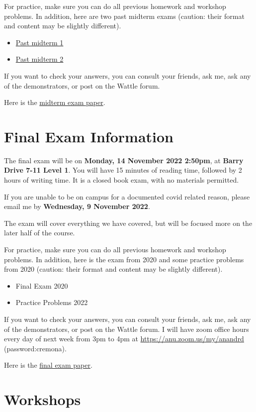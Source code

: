 \documentclass[11pt]{article}
\begin{document}
For practice, make sure you can do all previous homework and workshop problems.
In addition, here are two past midterm exams (caution: their format and content may be slightly different).

\begin{itemize}
\item \href{midterm-1-practice.pdf}{Past midterm 1}
\item \href{midterm-1-practice2.pdf}{Past midterm 2}
\end{itemize}

If you want to check your answers, you can consult your friends, ask me, ask any of the demonstrators, or post on the Wattle forum.

Here is the \href{midterm-msi.pdf}{midterm exam paper}.

\section{Final Exam Information}
\label{sec:orgc2e0692}
The final exam will be on \textbf{Monday, 14 November 2022 2:50pm}, at \textbf{Barry Drive 7-11 Level 1}.
You will have 15 minutes of reading time, followed by 2 hours of writing time.
It is a closed book exam, with no materials permitted.

If you are unable to be on campus for a documented covid related reason, please email me by \textbf{Wednesday, 9 November 2022}.

The exam will cover everything we have covered, but will be focused more on the later half of the course.

For practice, make sure you can do all previous homework and workshop problems.
In addition, here is the exam from 2020 and some practice problems from 2020 (caution: their format and content may be slightly different).

\begin{itemize}
\item Final Exam 2020
\item Practice Problems 2022
\end{itemize}

If you want to check your answers, you can consult your friends, ask me, ask any of the demonstrators, or post on the Wattle forum.
I will have zoom office hours every day of next week from 3pm to 4pm at \url{https://anu.zoom.us/my/anandrd} (password:cremona).

Here is the \href{final-msi.pdf}{final exam paper}.

\section{Workshops}
\label{sec:org0e90bcf}
\end{document}
